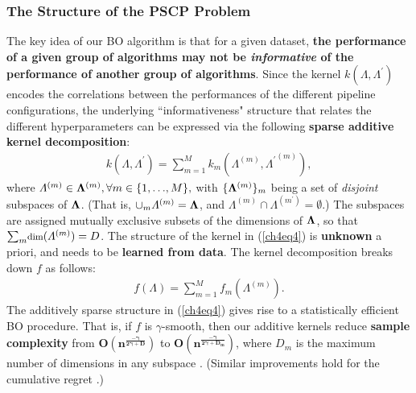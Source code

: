 \documentclass [PhD] {uclathes}
\begin{document}
\subsubsection{The Structure of the PSCP Problem} 
The key idea of our BO algorithm is that for a given dataset, {\bf the performance of a given group of algorithms may not be \textit{informative} of the performance of another group of algorithms}. Since the kernel \mbox{\footnotesize $k(\Lambda,\Lambda^{\prime})$} encodes the correlations between the performances of the different pipeline configurations, the underlying ``informativeness" structure that relates the different hyperparameters can be expressed via the following {\bf sparse additive kernel decomposition}:  
\begin{align}
k(\Lambda,\Lambda^{\prime}) = {\textstyle \sum}_{m=1}^{M} k_m(\Lambda^{(m)},{\Lambda^{\prime}}^{(m)}),
\label{ch4eq4}
\end{align}
where \mbox{\footnotesize $\Lambda^{(m)} \in {\bf \Lambda}^{(m)},\forall m \in \{1,.\,.\,.,M\},$} with \mbox{\footnotesize $\{{\bf \Lambda}^{(m)}\}_m$} being a set of {\it disjoint} subspaces of \mbox{\footnotesize ${\bf \Lambda}$}. (That is, \mbox{\footnotesize $\cup_m \Lambda^{(m)} = {\bf \Lambda}$}, and \mbox{\footnotesize $\Lambda^{(m)} \cap \Lambda^{(m^{\prime})} = \emptyset$}.) The subspaces are assigned mutually exclusive subsets of the dimensions of \mbox{\footnotesize ${\bf \Lambda}$}, so that \mbox{\footnotesize ${\textstyle \sum}_{m} \mbox{\footnotesize dim}(\Lambda^{(m)}) = D$}. The structure of the kernel in (\ref{ch4eq4}) is {\bf unknown} a priori, and needs to be {\bf learned from data}. The kernel decomposition breaks down $f$ as follows:
\begin{align}
f(\Lambda) = {\textstyle \sum}_{m=1}^{M} f_m(\Lambda^{(m)}).
\label{ch4eq5}
\end{align}
The additively sparse structure in (\ref{ch4eq4}) gives rise to a statistically efficient BO procedure. That is, if $f$ is $\gamma$-smooth, then our additive kernels reduce {\bf sample complexity} from \mbox{\footnotesize $\boldsymbol{O(n^{\frac{-\gamma}{2\gamma + D}})}$} to \mbox{\footnotesize $\boldsymbol{O(n^{\frac{-\gamma}{2\gamma + D_m}})}$}, where $D_m$ is the maximum number of dimensions in any subspace \cite{raskutti2009lower,yang2015minimax}. (Similar improvements hold for the cumulative regret \cite{kandasamy2015high}.)
\end{document}

